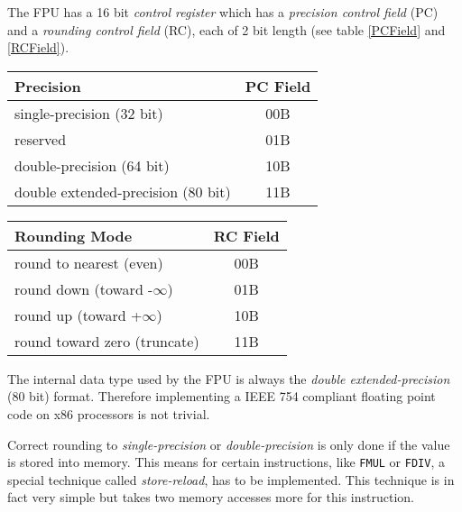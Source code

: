 The FPU has a 16 bit \textit{control register} which has a
\textit{precision control field} (PC) and a \textit{rounding control
field} (RC), each of 2 bit length (see table \ref{PCField} and
\ref{RCField}).

\begin{table*}
\begin{center}
\begin{tabular}[b]{|l|c|}
\hline 
Precision                          & PC Field \\ \hline
single-precision (32 bit)          & 00B      \\ \hline
reserved                           & 01B      \\ \hline
double-precision (64 bit)          & 10B      \\ \hline
double extended-precision (80 bit) & 11B      \\ \hline
\end{tabular}
\caption{Precision Control Field (PC)}
\label{PCField}
\end{center}
\end{table*}

\begin{table*}
\begin{center}
\begin{tabular}[b]{|l|c|}
\hline 
Rounding Mode                 & RC Field \\ \hline
round to nearest (even)       & 00B      \\ \hline
round down (toward -$\infty$) & 01B      \\ \hline
round up (toward +$\infty$)   & 10B      \\ \hline
round toward zero (truncate)  & 11B      \\ \hline
\end{tabular}
\caption{Rounding Control Field (RC)}
\label{RCField}
\end{center}
\end{table*}

The internal data type used by the FPU is always the \textit{double
extended-precision} (80 bit) format. Therefore implementing a IEEE 754
compliant floating point code on x86 processors is not trivial.

Correct rounding to \textit{single-precision} or
\textit{double-precision} is only done if the value is stored into
memory. This means for certain instructions, like \texttt{FMUL} or
\texttt{FDIV}, a special technique called \textit{store-reload}, has
to be implemented. This technique is in fact very simple but takes two
memory accesses more for this instruction.

